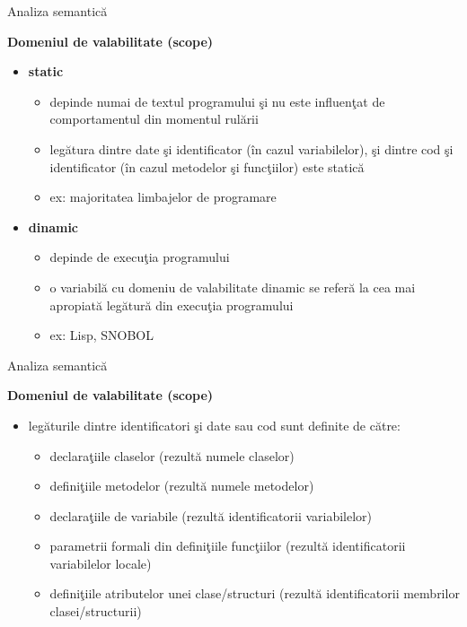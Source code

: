 \documentclass[pdf]{beamer}
\begin{document}
\begin{frame}{Analiza semantică}

\textbf{Domeniul de valabilitate (scope)}

\begin{itemize}
\item
\textbf{static}

\begin{itemize}
\item
depinde numai de textul programului şi nu este influenţat de comportamentul din momentul rulării
\item
legătura dintre date şi identificator (în cazul variabilelor), şi dintre cod şi identificator (în cazul metodelor şi funcţiilor) este statică
\item
ex: majoritatea limbajelor de programare
\end{itemize}

\item
\textbf{dinamic}
\begin{itemize}
\item
depinde de execuţia programului
\item
o variabilă cu domeniu de valabilitate dinamic se referă la cea mai apropiată legătură din execuţia programului
\item
ex: Lisp, SNOBOL
\end{itemize}
\end{itemize}
\end{frame}



\begin{frame}{Analiza semantică}

\textbf{Domeniul de valabilitate (scope)}

\begin{itemize}
\item
legăturile dintre identificatori şi date sau cod sunt definite de către:
\begin{itemize}
\item
declaraţiile claselor (rezultă numele claselor)

\item
definiţiile metodelor (rezultă numele metodelor)

\item
declaraţiile de variabile (rezultă identificatorii variabilelor)

\item
parametrii formali din definiţiile funcţiilor (rezultă identificatorii variabilelor locale)

\item
definiţiile atributelor unei clase/structuri (rezultă identificatorii membrilor clasei/structurii)
\end{itemize}
\end{itemize}
\end{frame}
\end{document}
